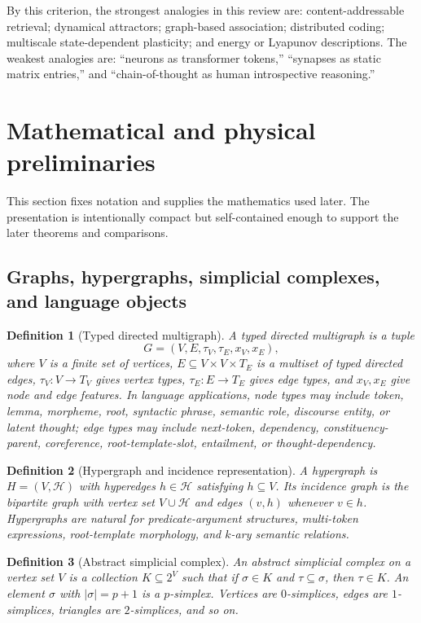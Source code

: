 \documentclass[11pt]{article}
\newtheorem{definition}{Definition}[section]
\newcommand{\1}{\mathbf{1}}
\begin{document}
By this criterion, the strongest analogies in this review are: content-addressable retrieval; dynamical attractors; graph-based association; distributed coding; multiscale state-dependent plasticity; and energy or Lyapunov descriptions. The weakest analogies are: ``neurons as transformer tokens,'' ``synapses as static matrix entries,'' and ``chain-of-thought as human introspective reasoning.''

\section{Mathematical and physical preliminaries}

This section fixes notation and supplies the mathematics used later. The presentation is intentionally compact but self-contained enough to support the later theorems and comparisons.

\subsection{Graphs, hypergraphs, simplicial complexes, and language objects}

\begin{definition}[Typed directed multigraph]
A typed directed multigraph is a tuple
\[
G=(V,E,\tau_V,\tau_E,x_V,x_E),
\]
where $V$ is a finite set of vertices, $E\subseteq V\times V\times T_E$ is a multiset of typed directed edges, $\tau_V:V\to T_V$ gives vertex types, $\tau_E:E\to T_E$ gives edge types, and $x_V,x_E$ give node and edge features. In language applications, node types may include token, lemma, morpheme, root, syntactic phrase, semantic role, discourse entity, or latent thought; edge types may include next-token, dependency, constituency-parent, coreference, root-template-slot, entailment, or thought-dependency.
\end{definition}

\begin{definition}[Hypergraph and incidence representation]
A hypergraph is $H=(V,\mathcal{H})$ with hyperedges $h\in\mathcal{H}$ satisfying $h\subseteq V$. Its incidence graph is the bipartite graph with vertex set $V\cup\mathcal{H}$ and edges $(v,h)$ whenever $v\in h$. Hypergraphs are natural for predicate-argument structures, multi-token expressions, root-template morphology, and $k$-ary semantic relations.
\end{definition}

\begin{definition}[Abstract simplicial complex]
An abstract simplicial complex on a vertex set $V$ is a collection $K\subseteq 2^V$ such that if $\sigma\in K$ and $\tau\subseteq\sigma$, then $\tau\in K$. An element $\sigma$ with $|\sigma|=p+1$ is a $p$-simplex. Vertices are $0$-simplices, edges are $1$-simplices, triangles are $2$-simplices, and so on.
\end{definition}
\end{document}
